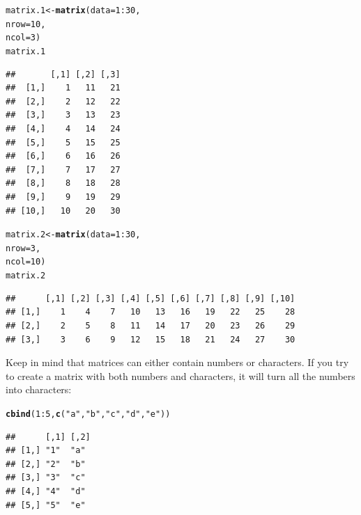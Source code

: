 \documentclass{tufte-book}\usepackage[]{graphicx}\usepackage[]{color}
\makeatletter
\newcommand{\hlnum}[1]{\textcolor[rgb]{0.686,0.059,0.569}{#1}}%
\newcommand{\hlstr}[1]{\textcolor[rgb]{0.192,0.494,0.8}{#1}}%
\newcommand{\hlopt}[1]{\textcolor[rgb]{0,0,0}{#1}}%
\newcommand{\hlstd}[1]{\textcolor[rgb]{0.345,0.345,0.345}{#1}}%
\newcommand{\hlkwb}[1]{\textcolor[rgb]{0.69,0.353,0.396}{#1}}%
\newcommand{\hlkwc}[1]{\textcolor[rgb]{0.333,0.667,0.333}{#1}}%
\newcommand{\hlkwd}[1]{\textcolor[rgb]{0.737,0.353,0.396}{\textbf{#1}}}%
\newenvironment{kframe}{%
 \def\at@end@of@kframe{}%
 \ifinner\ifhmode%
  \def\at@end@of@kframe{\end{minipage}}%
  \begin{minipage}{\columnwidth}%
 \fi\fi%
 \def\FrameCommand##1{\hskip\@totalleftmargin \hskip-\fboxsep
 \colorbox{shadecolor}{##1}\hskip-\fboxsep
     \hskip-\linewidth \hskip-\@totalleftmargin \hskip\columnwidth}%
 \MakeFramed {\advance\hsize-\width
   \@totalleftmargin\z@ \linewidth\hsize
   \@setminipage}}%
 {\par\unskip\endMakeFramed%
 \at@end@of@kframe}
\newenvironment{knitrout}{}{} %
\makeatother
\begin{document}
\begin{footnotesize}
\begin{footnotesize}
\begin{knitrout}
\color{fgcolor}\begin{kframe}
\begin{alltt}
\hlstd{matrix.1} \hlkwb{<-} \hlkwd{matrix}\hlstd{(}\hlkwc{data} \hlstd{=} \hlnum{1}\hlopt{:}\hlnum{30}\hlstd{,}
                   \hlkwc{nrow} \hlstd{=} \hlnum{10}\hlstd{,}
                   \hlkwc{ncol} \hlstd{=} \hlnum{3}\hlstd{)}
\hlstd{matrix.1}
\end{alltt}
\begin{verbatim}
##       [,1] [,2] [,3]
##  [1,]    1   11   21
##  [2,]    2   12   22
##  [3,]    3   13   23
##  [4,]    4   14   24
##  [5,]    5   15   25
##  [6,]    6   16   26
##  [7,]    7   17   27
##  [8,]    8   18   28
##  [9,]    9   19   29
## [10,]   10   20   30
\end{verbatim}
\begin{alltt}
\hlstd{matrix.2} \hlkwb{<-} \hlkwd{matrix}\hlstd{(}\hlkwc{data} \hlstd{=} \hlnum{1}\hlopt{:}\hlnum{30}\hlstd{,}
                   \hlkwc{nrow} \hlstd{=} \hlnum{3}\hlstd{,}
                   \hlkwc{ncol} \hlstd{=} \hlnum{10}\hlstd{)}
\hlstd{matrix.2}
\end{alltt}
\begin{verbatim}
##      [,1] [,2] [,3] [,4] [,5] [,6] [,7] [,8] [,9] [,10]
## [1,]    1    4    7   10   13   16   19   22   25    28
## [2,]    2    5    8   11   14   17   20   23   26    29
## [3,]    3    6    9   12   15   18   21   24   27    30
\end{verbatim}
\end{kframe}
\end{knitrout}
\end{footnotesize}

Keep in mind that matrices can either contain numbers or characters. If you try to create a matrix with both numbers and characters, it will turn all the numbers into characters:

\begin{footnotesize}
\begin{knitrout}
\color{fgcolor}\begin{kframe}
\begin{alltt}
\hlkwd{cbind}\hlstd{(}\hlnum{1}\hlopt{:}\hlnum{5}\hlstd{,} \hlkwd{c}\hlstd{(}\hlstr{"a"}\hlstd{,} \hlstr{"b"}\hlstd{,} \hlstr{"c"}\hlstd{,} \hlstr{"d"}\hlstd{,} \hlstr{"e"}\hlstd{))}
\end{alltt}
\begin{verbatim}
##      [,1] [,2]
## [1,] "1"  "a" 
## [2,] "2"  "b" 
## [3,] "3"  "c" 
## [4,] "4"  "d" 
## [5,] "5"  "e"
\end{verbatim}
\end{kframe}
\end{knitrout}
\end{footnotesize}


\end{footnotesize}
\end{document}
